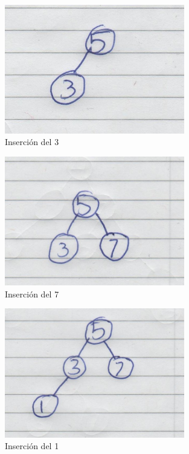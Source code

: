 \begin{figure}[H]
	\centering
	\includegraphics[width=0.7\textwidth]{./images/otraimagen4.jpg}
	\caption{Inserción del 3}
\end{figure}
\begin{figure}[H]
	\centering
	\includegraphics[width=0.7\textwidth]{./images/otraimagen5.jpg}
	\caption{Inserción del 7}
\end{figure}
\begin{figure}[H]
	\centering
	\includegraphics[width=0.7\textwidth]{./images/otraimagen6.jpg}
	\caption{Inserción del 1}
\end{figure}
